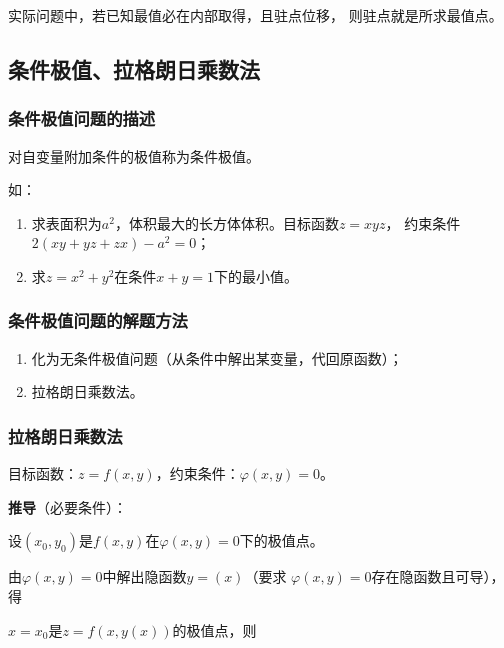 \documentclass[12pt, a4paper]{article}
\numberwithin{equation}{section}
\begin{document}
    实际问题中，若已知最值必在内部取得，且驻点位移，
    则驻点就是所求最值点。

\subsection{条件极值、拉格朗日乘数法}

\subsubsection{条件极值问题的描述}

    对自变量附加条件的极值称为条件极值。

    如：

    \begin{enumerate}
        \item 求表面积为\(a^2\)，体积最大的长方体体积。目标函数\(z=xyz\)，
            约束条件\(2\left(xy+yz+zx\right) - a^2=0\)；
        \item 求\(z=x^2+y^2\)在条件\(x+y=1\)下的最小值。
    \end{enumerate}

\subsubsection{条件极值问题的解题方法}

    \begin{enumerate}
        \item 化为无条件极值问题（从条件中解出某变量，代回原函数）；
        \item 拉格朗日乘数法。
    \end{enumerate}

\subsubsection{拉格朗日乘数法}

    目标函数：\(z=f\left(x,y\right)\)，约束条件：\(\varphi\left(x,y \right)=0\)。
    \vspace{1em}

    \textbf{推导}（必要条件）：

    设\(\left(x_0,y_0\right)\)是\(f\left(x,y\right)\)在\(\varphi\left(x,y \right)=0\)下的极值点。

    由\(\varphi\left(x,y \right)=0\)中解出隐函数\(y=\left(x\right)\)（要求
    \(\varphi\left(x,y \right)=0\)存在隐函数且可导），得

    \(x=x_0\)是\(z=f\left(x,y\left(x \right)\right)\)的极值点，则
\end{document}
